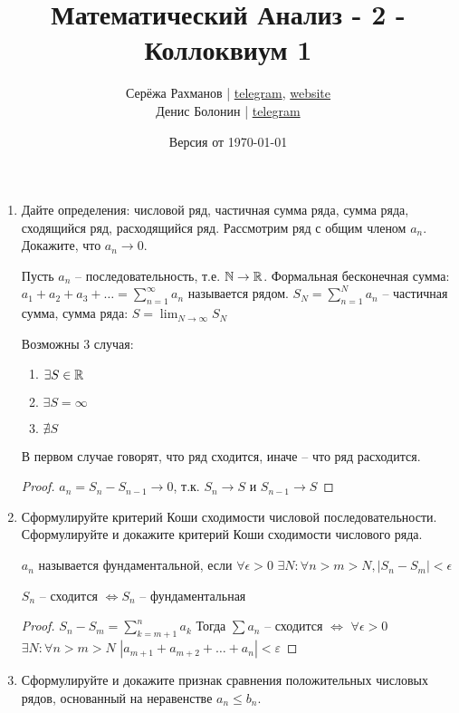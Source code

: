 \documentclass[a4paper]{article}
\title{\Huge Математический Анализ - 2 - Коллоквиум 1}
\author{
    Серёжа Рахманов | \href{https://t.me/virg1n}{telegram}, \href{http://shoraii.github.io}{website}
    \\
    Денис Болонин | \href{https://t.me/ultrakekul}{telegram}

}
\date{Версия от {\ddmmyyyydate\today} \currenttime}
\begin{document}
    \maketitle

    \begin{enumerate}
        \item Дайте определения: числовой ряд, частичная сумма ряда, сумма ряда, сходящийся ряд, расходящийся ряд. Рассмотрим ряд с общим членом $a_n$. Докажите, что $a_n \to 0$.
        \begin{definition}
        Пусть $a_{n}$ -- последовательность, т.е. $\mathbb{N} \rightarrow \mathbb{R}$. Формальная бесконечная сумма: $a_1 + a_2 + a_3 + \dots = \sum_{n=1}^{\infty} a_n$ называется рядом.
        $S_N = \sum_{n = 1}^{N} a_n$ -- частичная сумма, сумма ряда: $S = \lim_{N \rightarrow \infty} S_N$
        \end{definition}
        
        Возможны 3 случая:
        \begin{enumerate}
            \item $\exists S \in \mathbb{R}$
            \item $\exists S = \infty$
            \item $\nexists S$
        \end{enumerate}
        
        В первом случае говорят, что ряд сходится, иначе -- что ряд расходится.

        \begin{comment}~
            Если ряд сходится, то $a_n \rightarrow 0$
        \end{comment}
        \begin{proof}
            $a_n = S_n - S_{n - 1} \rightarrow 0$, т.к. $S_n \rightarrow S$ и $S_{n - 1} \rightarrow S$
        \end{proof}
        \item Сформулируйте критерий Коши сходимости числовой последовательности. Сформулируйте и докажите критерий Коши сходимости числового ряда.
        \begin{definition}
            ${a_n}$ называется фундаментальной, если $\forall \epsilon > 0$  $\exists N: \forall n > m > N, |S_n - S_m| < \epsilon$
        \end{definition}
        \begin{theorem}
            ${S_n}$ -- сходится $\Leftrightarrow {S_n}$ -- фундаментальная
        \end{theorem}
        \begin{proof}
        $S_n - S_m = \sum_{k = m + 1}^{n} a_{k}$
        Тогда $\sum a_n$ -- сходится $\Leftrightarrow$ $\forall \epsilon > 0$  $\exists N: \forall n > m > N$
        $|a_{m + 1} + a_{m + 2} + \dots + a_{n}| < \varepsilon$
        \end{proof}
        \item Сформулируйте и докажите признак сравнения положительных числовых рядов, основанный на неравенстве $a_n \leq b_n$.
        

\end{enumerate}
\end{document}
